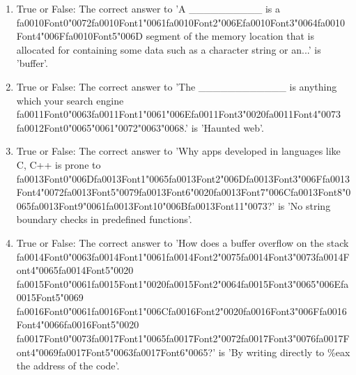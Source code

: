 \documentclass[12pt]{article}
\begin{document}
\begin{enumerate}[label=\arabic*.]
\item True or False: The correct answer to 'A \_\_\_\_\_\_\_\_\_\_ is a {\csname fa0010Font0\endcsname\char"0072}{\csname fa0010Font1\endcsname\char"0061}{\csname fa0010Font2\endcsname\char"006E}{\csname fa0010Font3\endcsname\char"0064}{\csname fa0010Font4\endcsname\char"006F}{\csname fa0010Font5\endcsname\char"006D} segment of the memory location that is allocated for containing some data such as a character string or an...' is 'buffer'.
\item True or False: The correct answer to 'The \_\_\_\_\_\_\_\_\_\_\_\_ is anything which your search engine {\csname fa0011Font0\endcsname\char"0063}{\csname fa0011Font1\endcsname\char"0061}{\char"006E}{\csname fa0011Font3\endcsname\char"0020}{\csname fa0011Font4\endcsname\char"0073} {\csname fa0012Font0\endcsname\char"0065}{\char"0061}{\char"0072}{\char"0063}{\char"0068}.' is 'Haunted web'.
\item True or False: The correct answer to 'Why apps developed in languages like C, C++ is prone to {\csname fa0013Font0\endcsname\char"006D}{\csname fa0013Font1\endcsname\char"0065}{\csname fa0013Font2\endcsname\char"006D}{\csname fa0013Font3\endcsname\char"006F}{\csname fa0013Font4\endcsname\char"0072}{\csname fa0013Font5\endcsname\char"0079}{\csname fa0013Font6\endcsname\char"0020}{\csname fa0013Font7\endcsname\char"006C}{\csname fa0013Font8\endcsname\char"0065}{\csname fa0013Font9\endcsname\char"0061}{\csname fa0013Font10\endcsname\char"006B}{\csname fa0013Font11\endcsname\char"0073}?' is 'No string boundary checks in predefined functions'.
\item True or False: The correct answer to 'How does a buffer overflow on the stack {\csname fa0014Font0\endcsname\char"0063}{\csname fa0014Font1\endcsname\char"0061}{\csname fa0014Font2\endcsname\char"0075}{\csname fa0014Font3\endcsname\char"0073}{\csname fa0014Font4\endcsname\char"0065}{\csname fa0014Font5\endcsname\char"0020} {\csname fa0015Font0\endcsname\char"0061}{\csname fa0015Font1\endcsname\char"0020}{\csname fa0015Font2\endcsname\char"0064}{\csname fa0015Font3\endcsname\char"0065}{\char"006E}{\csname fa0015Font5\endcsname\char"0069} {\csname fa0016Font0\endcsname\char"0061}{\csname fa0016Font1\endcsname\char"006C}{\csname fa0016Font2\endcsname\char"0020}{\csname fa0016Font3\endcsname\char"006F}{\csname fa0016Font4\endcsname\char"0066}{\csname fa0016Font5\endcsname\char"0020} {\csname fa0017Font0\endcsname\char"0073}{\csname fa0017Font1\endcsname\char"0065}{\csname fa0017Font2\endcsname\char"0072}{\csname fa0017Font3\endcsname\char"0076}{\csname fa0017Font4\endcsname\char"0069}{\csname fa0017Font5\endcsname\char"0063}{\csname fa0017Font6\endcsname\char"0065}?' is 'By writing directly to \%eax the address of the code'.

\end{enumerate}
\end{document}
